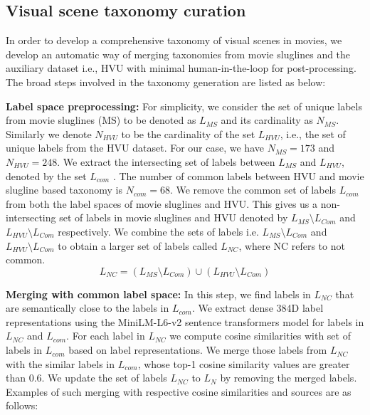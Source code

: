 \subsection{Visual scene taxonomy curation}
In order to develop a comprehensive taxonomy of visual scenes in movies, we develop an automatic way of merging taxonomies from movie sluglines and the auxiliary dataset i.e., HVU with minimal human-in-the-loop for post-processing. The broad steps involved in the taxonomy generation are listed as below:
\par
\textbf{Label space preprocessing:} For simplicity, we consider the set of unique labels from movie sluglines (MS) to be denoted as $L_{MS}$ and its cardinality as $N_{MS}$. Similarly we denote $N_{HVU}$ to be the cardinality of the set $L_{HVU}$, i.e., the set of unique labels from the HVU dataset. For our case, we have $N_{MS}=173$ and $N_{HVU}=248$. We extract the intersecting set of labels between $L_{MS}$ and $L_{HVU}$, denoted by the set $L_{com}$ . The number of common labels between HVU and movie slugline based taxonomy is $N_{com}=68$. We remove the common set of labels $L_{com}$ from both the label spaces of movie sluglines and HVU. This gives us a non-intersecting set of labels in movie sluglines and HVU denoted by $L_{MS} \setminus L_{Com}$  and $L_{HVU} \setminus L_{Com}$ respectively.  We combine the sets of labels i.e. $L_{MS} \setminus L_{Com}$ and $L_{HVU} \setminus L_{Com}$ to obtain a larger set of labels called $L_{NC}$, where NC refers to not common. 
\begin{equation}
    L_{NC}=(L_{MS} \setminus L_{Com}) \cup (L_{HVU} \setminus L_{Com})
\end{equation}
\par 
\textbf{Merging with common label space:}
In this step, we find labels in $L_{NC}$ that are semantically close to the labels in $L_{com}$. We extract dense 384D label representations using the MiniLM-L6-v2 sentence transformers model \cite{reimers-2019-sentence-bert} for labels in $L_{NC}$ and $L_{com}$. For each label in $L_{NC}$ we compute cosine similarities with set of labels in $L_{com}$ based on label representations. We merge those labels from $L_{NC}$ with the similar labels in $L_{com}$, whose top-1 cosine similarity values are greater than 0.6. We update the set of labels $L_{NC}$ to $L_{N}$ by removing the merged labels.
Examples of such merging with respective cosine similarities and sources are as follows:

